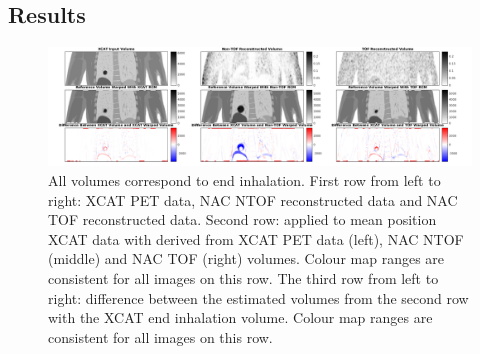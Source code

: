         \subsection{Results} \label{sec:impact_of_tof_on_respiratory_motion_model_estimation_using_pre_gated_no_intra_cycle_motion_nac_pet_results}
            \begin{figure}
                \centering
                
                \includegraphics[width=1.0\linewidth]{figures/motion_correction_results_1_output.png}
                
                \captionsetup{singlelinecheck=false, justification=raggedright}
                \caption{All volumes correspond to end inhalation. First row from left to right: \gls{XCAT} \gls{PET} data, \gls{NAC} \gls{NTOF} reconstructed data and \gls{NAC} \gls{TOF} reconstructed data. Second row:  applied to mean position \gls{XCAT} data with  derived from \gls{XCAT} \gls{PET} data (left), \gls{NAC} \gls{NTOF} (middle) and \gls{NAC} \gls{TOF} (right) volumes. Colour map ranges are consistent for all images on this row. The third row from left to right:  difference between the estimated volumes from the second row with the \gls{XCAT} end inhalation volume. Colour map ranges are consistent for all images on this row.} \label{fig:impact_of_tof_on_respiratory_motion_model_estimation_using_pre_gated_no_intra_cycle_motion_nac_pet_results_output}
            \end{figure}
            
